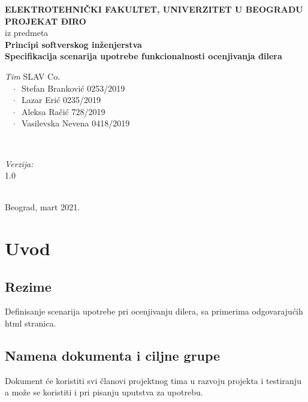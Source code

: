 \documentclass[12pt]{article}
\begin{document}
    \renewcommand{\labelenumii}{\arabic{enumi}.\arabic{enumii}}
	\begin{titlepage}  
		\center
		\textbf{ \LARGE ELEKTROTEHNIČKI FAKULTET, UNIVERZITET U BEOGRADU } \\[4cm]
		\textbf{ \Large PROJEKAT ĐIRO\texttrademark} \\[0.3cm]
		iz predmeta \\[0.3cm]
		\textbf{ \Large Principi softverskog inženjerstva} \\[0.7cm]
		{ \huge \bfseries Specifikacija scenarija upotrebe funkcionalnosti ocenjivanja đilera } \\[6cm]
		

		\begin{minipage}{0.5\textwidth}
			\begin{flushleft}
				\large
				\emph{Tim} SLAV Co. \\
			     $\;\;\; \cdot \;\;$Stefan Branković  0253/2019\\
			     $\;\;\; \cdot \;\;$Lazar Erić 0235/2019\\
			     $\;\;\; \cdot \;\;$Aleksa Račić 728/2019\\
			     $\;\;\; \cdot \;\;$Vasilevska Nevena 0418/2019
			\end{flushleft}
		\end{minipage}
		~
		\begin{minipage}{0.4\textwidth}
			\begin{flushright}
				\large
				\emph{Verzija:} \\
				1.0
			\end{flushright}
		\end{minipage} \\[2cm]
		\enlargethispage{4\baselineskip}
		{ \large Beograd, mart 2021. }
		\vfill
	\end{titlepage}
\pagebreak
\tableofcontents
\pagebreak



\section{Uvod}
\subsection{Rezime}
Definisanje scenarija upotrebe pri ocenjivanju dilera, sa primerima odgovarajućih html stranica.
\subsection{Namena dokumenta i ciljne grupe}
Dokument će koristiti svi članovi projektnog tima u razvoju projekta i testiranju a može se koristiti i pri pisanju uputstva za
upotrebu.
\end{document}
